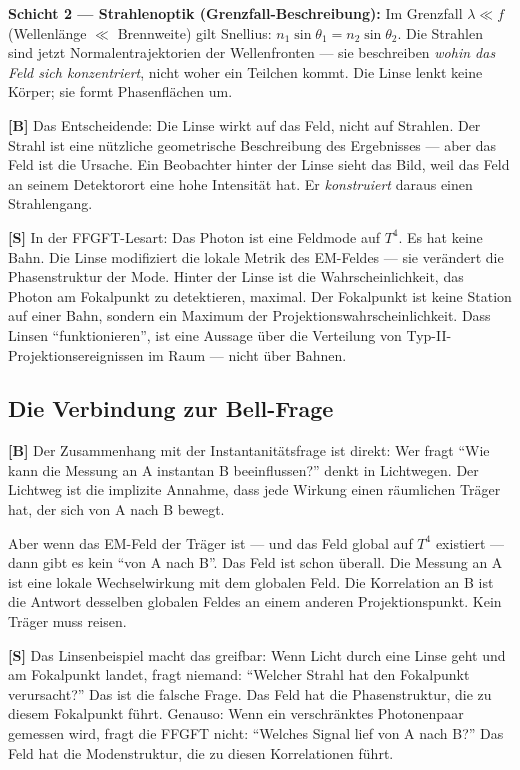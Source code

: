 \textbf{Schicht 2 --- Strahlenoptik (Grenzfall-Beschreibung):}
Im Grenzfall $\lambda \ll f$ (Wellenlänge $\ll$ Brennweite) gilt
Snellius: $n_1 \sin\theta_1 = n_2 \sin\theta_2$. Die Strahlen sind
jetzt Normalentrajektorien der Wellenfronten --- sie beschreiben
\emph{wohin das Feld sich konzentriert}, nicht woher ein Teilchen
kommt. Die Linse lenkt keine Körper; sie formt Phasenflächen um.

\textbf{[B]} Das Entscheidende: Die Linse wirkt auf das Feld, nicht
auf Strahlen. Der Strahl ist eine nützliche geometrische Beschreibung
des Ergebnisses --- aber das Feld ist die Ursache. Ein Beobachter
hinter der Linse sieht das Bild, weil das Feld an seinem Detektorort
eine hohe Intensität hat. Er \emph{konstruiert} daraus einen Strahlengang.

\textbf{[S]} In der FFGFT-Lesart: Das Photon ist eine Feldmode auf
$T^4$. Es hat keine Bahn. Die Linse modifiziert die lokale Metrik
des EM-Feldes --- sie verändert die Phasenstruktur der Mode. Hinter
der Linse ist die Wahrscheinlichkeit, das Photon am Fokalpunkt zu
detektieren, maximal. Der Fokalpunkt ist keine Station auf einer Bahn,
sondern ein Maximum der Projektionswahrscheinlichkeit. Dass Linsen
``funktionieren'', ist eine Aussage über die Verteilung von
Typ-II-Projektionsereignissen im Raum --- nicht über Bahnen.

\subsection{Die Verbindung zur Bell-Frage}

\textbf{[B]} Der Zusammenhang mit der Instantanitätsfrage ist direkt:
Wer fragt ``Wie kann die Messung an A instantan B beeinflussen?''
denkt in Lichtwegen. Der Lichtweg ist die implizite Annahme, dass
jede Wirkung einen räumlichen Träger hat, der sich von A nach B bewegt.

Aber wenn das EM-Feld der Träger ist --- und das Feld global auf $T^4$
existiert --- dann gibt es kein ``von A nach B''. Das Feld ist schon überall.
Die Messung an A ist eine lokale Wechselwirkung mit dem globalen Feld.
Die Korrelation an B ist die Antwort desselben globalen Feldes an einem
anderen Projektionspunkt. Kein Träger muss reisen.

\textbf{[S]} Das Linsenbeispiel macht das greifbar: Wenn Licht durch
eine Linse geht und am Fokalpunkt landet, fragt niemand: ``Welcher
Strahl hat den Fokalpunkt verursacht?'' Das ist die falsche Frage.
Das Feld hat die Phasenstruktur, die zu diesem Fokalpunkt führt.
Genauso: Wenn ein verschränktes Photonenpaar gemessen wird, fragt
die FFGFT nicht: ``Welches Signal lief von A nach B?'' Das Feld
hat die Modenstruktur, die zu diesen Korrelationen führt.

